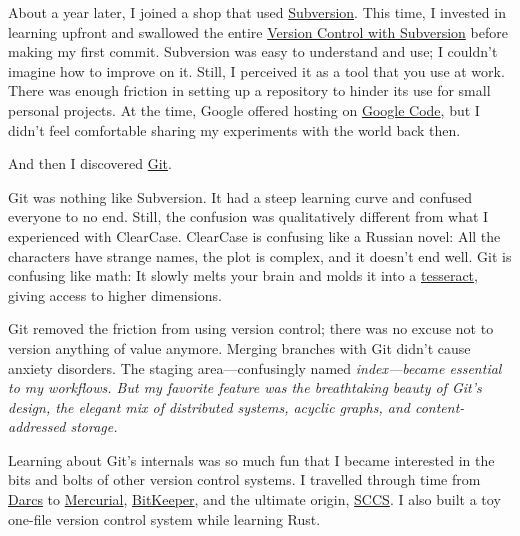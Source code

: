 \documentclass{article}
\begin{document}
About a year later, I joined a shop that used \href{https://subversion.apache.org/}{Subversion}.
This time, I invested in learning upfront and swallowed the entire \href{https://svnbook.red-bean.com/}{Version Control with Subversion} before making my first commit.
Subversion was easy to understand and use; I couldn't imagine how to improve on it.
Still, I perceived it as a tool that you use at work.
There was enough friction in setting up a repository to hinder its use for small personal projects.
At the time, Google offered hosting on \href{https://code.google.com/}{Google Code}, but I didn't feel comfortable sharing my experiments with the world back then.

And then I discovered \href{https://git-scm.com/}{Git}.

Git was nothing like Subversion.
It had a steep learning curve and confused everyone to no end.
Still, the confusion was qualitatively different from what I experienced with ClearCase.
ClearCase is confusing like a Russian novel: All the characters have strange names, the plot is complex, and it doesn't end well.
Git is confusing like math: It slowly melts your brain and molds it into a \href{https://en.wikipedia.org/wiki/Tesseract}{tesseract}, giving access to higher dimensions.

Git removed the friction from using version control; there was no excuse not to version anything of value anymore.
Merging branches with Git didn't cause anxiety disorders.
The staging area---confusingly named \em{index}---became essential to my workflows.
But my favorite feature was the breathtaking beauty of Git's design, the elegant mix of distributed systems, acyclic graphs, and content-addressed storage.

Learning about Git's internals was so much fun that I became interested in the bits and bolts of other version control systems.
I travelled through time from \href{https://darcs.net/}{Darcs} to \href{https://www.mercurial-scm.org/}{Mercurial}, \href{https://www.bitkeeper.org/}{BitKeeper}, and the ultimate origin, \href{https://en.wikipedia.org/wiki/Source_Code_Control_System}{SCCS}.
I also built a toy one-file version control system while learning Rust.
\end{document}
